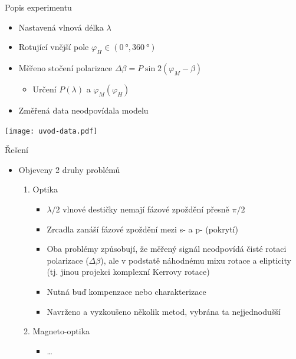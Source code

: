 \documentclass{beamer}
\begin{document}
\begin{frame}{Popis experimentu}
    \begin{itemize}
        \item Nastavená vlnová délka $\lambda$
        \item Rotující vnější pole $\varphi_{H} \in (\SI{0}{\degree},\SI{360}{\degree})$
        \item Měřeno stočení polarizace $\Delta\beta = P \sin 2 (\varphi_M - \beta)$
            \begin{itemize}
                \item Určení $P(\lambda)$ a $\varphi_M(\varphi_H)$
            \end{itemize}
        \item Změřená data neodpovídala modelu
    \end{itemize}
    \texttt{[image: uvod-data.pdf]}
\end{frame}

\begin{frame}{Řešení}
    \begin{itemize}
        \item Objeveny 2 druhy problémů
            \begin{enumerate}
                \item Optika
                    \begin{itemize}
                        \item $\lambda/2$ vlnové destičky nemají fázové zpoždění přesně $\pi/2$

                        \item Zrcadla zanáší fázové zpoždění mezi s- a p- (pokrytí)
                        \item Oba problémy způsobují, že měřený signál neodpovídá čisté rotaci polarizace ($\Delta\beta$), ale v podstatě náhodnému mixu rotace a elipticity (tj. jinou projekci komplexní Kerrovy rotace)
                        \item Nutná buď kompenzace nebo charakterizace
                        \item Navrženo a vyzkoušeno několik metod, vybrána ta nejjednodušší
                    \end{itemize}
                \item Magneto-optika
                    \begin{itemize}
                        \item \ldots
                    \end{itemize}
            \end{enumerate}
    \end{itemize}
\end{frame}
\end{document}
